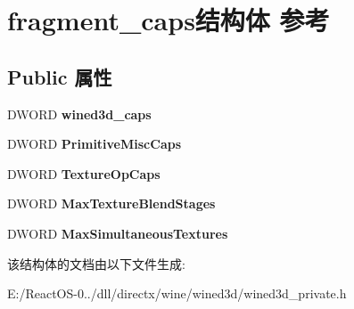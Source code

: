 \hypertarget{structfragment__caps}{}\section{fragment\+\_\+caps结构体 参考}
\label{structfragment__caps}
\subsection*{Public 属性}
\begin{DoxyCompactItemize}
\item 
\mbox{\label{structfragment__caps_a5a8b8d333cece8fdbf38b09350c964a0}} 
D\+W\+O\+RD {\bfseries wined3d\+\_\+caps}
\item 
\mbox{\label{structfragment__caps_a2e03ba9606f3e6be8eab8a6130e89bc0}} 
D\+W\+O\+RD {\bfseries Primitive\+Misc\+Caps}
\item 
\mbox{\label{structfragment__caps_ac59ef810a55a53d65eb37c8c6317ee8b}} 
D\+W\+O\+RD {\bfseries Texture\+Op\+Caps}
\item 
\mbox{\label{structfragment__caps_ae16091019d21563d3bba108e285b5e96}} 
D\+W\+O\+RD {\bfseries Max\+Texture\+Blend\+Stages}
\item 
\mbox{\label{structfragment__caps_a02806abc55899f804952d91e89340898}} 
D\+W\+O\+RD {\bfseries Max\+Simultaneous\+Textures}
\end{DoxyCompactItemize}


该结构体的文档由以下文件生成\+:\begin{DoxyCompactItemize}
\item 
E\+:/\+React\+O\+S-\/0../dll/directx/wine/wined3d/wined3d\+\_\+private.\+h\end{DoxyCompactItemize}
